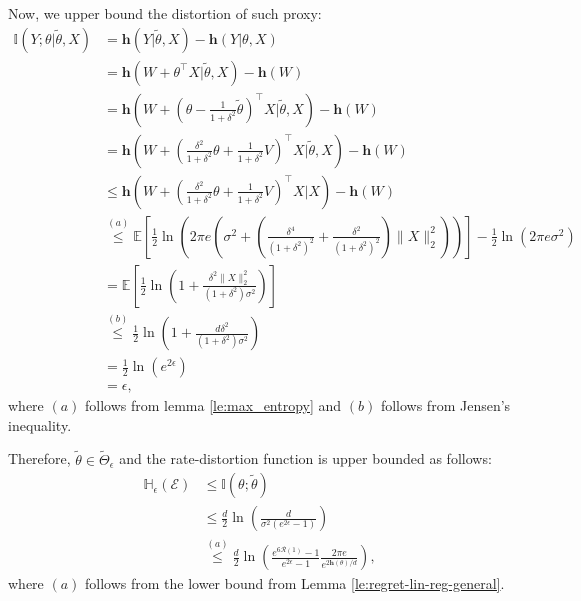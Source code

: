 \documentclass[twoside,11pt]{article}
\renewenvironment{proof}{\par\noindent{\bf Proof\ }}{\hfill\BlackBox\\[2mm]}
\newenvironment{proof}{\par\noindent{\bf Proof\ }}{\hfill\BlackBox\\[2mm]}
\def\environment{\mathcal{E}}
\def\proxyset{\tilde{\Theta}}
\def\regret{\mathcal{R}}
\def\diffentropy{\bf h}
\def\proxytheta{\tilde{\theta}}
\def\E{\mathbb{E}}
\def\H{\mathbb{H}}
\def\diffentropy{\mathbf{h}}
\def\I{\mathbb{I}}
\begin{document}
\begin{proof}
    Now, we upper bound the distortion of such proxy:
    \begin{align*}
        \I(Y;\theta|\proxytheta, X)
        & = \diffentropy(Y|\proxytheta, X) - \diffentropy(Y|\theta, X)\\
        & = \diffentropy(W + \theta^\top X|\proxytheta, X) - \diffentropy(W)\\
        & = \diffentropy(W + (\theta - \frac{1}{1+\delta^2}\proxytheta)^\top X|\proxytheta, X) - \diffentropy(W)\\
        & = \diffentropy(W + \left(\frac{\delta^2}{1+\delta^2}\theta + \frac{1}{1+\delta^2}V\right)^\top X|\proxytheta, X) - \diffentropy(W)\\
        & \leq \diffentropy(W + \left(\frac{\delta^2}{1+\delta^2}\theta + \frac{1}{1+\delta^2}V\right)^\top X|X) - \diffentropy(W)\\
        & \overset{(a)}{\leq} \E\left[\frac{1}{2}\ln\left(2\pi e\left(\sigma^2 + \left(\frac{\delta^4}{(1 + \delta^2)^2} + \frac{\delta^2}{(1 + \delta^2)^2}\right)\|X\|^2_2\right)\right)\right] - \frac{1}{2}\ln\left(2\pi e \sigma^2\right)\\
        & = \E\left[\frac{1}{2}\ln\left(1 + \frac{\delta^2\|X\|^2_2}{(1 + \delta^2)\sigma^2}\right)\right]\\
        & \overset{(b)}{\leq} \frac{1}{2}\ln\left(1 + \frac{d\delta^2}{(1+\delta^2)\sigma^2}\right)\\
        & = \frac{1}{2}\ln\left(e^{2\epsilon}\right)\\
        & = \epsilon,
    \end{align*}
    where $(a)$ follows from lemma \ref{le:max_entropy} and $(b)$ follows from Jensen's inequality.\newline
    
    Therefore, $\proxytheta \in \proxyset_\epsilon$ and the rate-distortion function is upper bounded as follows:
    \begin{align*}
        \H_\epsilon(\environment)
        & \leq \I(\theta;\proxytheta)\\
        & \leq \frac{d}{2}\ln\left(\frac{d}{\sigma^2(e^{2\epsilon}-1)}\right)\\
        & \overset{(a)}{\leq} \frac{d}{2}\ln\left(\frac{e^{6\regret(1)}-1}{e^{2\epsilon}-1} \frac{2\pi e}{e^{2\diffentropy(\theta)/d}}\right),
    \end{align*}
    where $(a)$ follows from the lower bound from Lemma \ref{le:regret-lin-reg-general}.
\end{proof}
\end{document}
